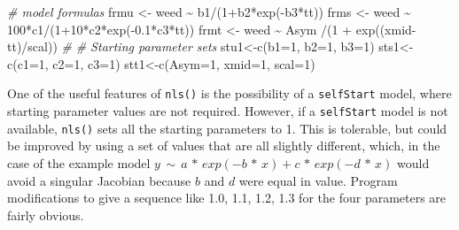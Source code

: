 \documentclass[
]{article}
\newenvironment{Shaded}{\begin{snugshade}}{\end{snugshade}}
\newcommand{\AttributeTok}[1]{\textcolor[rgb]{0.77,0.63,0.00}{#1}}
\newcommand{\CommentTok}[1]{\textcolor[rgb]{0.56,0.35,0.01}{\textit{#1}}}
\newcommand{\DecValTok}[1]{\textcolor[rgb]{0.00,0.00,0.81}{#1}}
\newcommand{\FloatTok}[1]{\textcolor[rgb]{0.00,0.00,0.81}{#1}}
\newcommand{\FunctionTok}[1]{\textcolor[rgb]{0.00,0.00,0.00}{#1}}
\newcommand{\NormalTok}[1]{#1}
\newcommand{\OtherTok}[1]{\textcolor[rgb]{0.56,0.35,0.01}{#1}}
\newcommand{\SpecialCharTok}[1]{\textcolor[rgb]{0.00,0.00,0.00}{#1}}
\begin{document}
\begin{Shaded}
\begin{Highlighting}[]
\CommentTok{\# model formulas}
\NormalTok{frmu }\OtherTok{\textless{}{-}}\NormalTok{ weed }\SpecialCharTok{\textasciitilde{}}\NormalTok{ b1}\SpecialCharTok{/}\NormalTok{(}\DecValTok{1}\SpecialCharTok{+}\NormalTok{b2}\SpecialCharTok{*}\FunctionTok{exp}\NormalTok{(}\SpecialCharTok{{-}}\NormalTok{b3}\SpecialCharTok{*}\NormalTok{tt))}
\NormalTok{frms }\OtherTok{\textless{}{-}}\NormalTok{ weed }\SpecialCharTok{\textasciitilde{}} \DecValTok{100}\SpecialCharTok{*}\NormalTok{c1}\SpecialCharTok{/}\NormalTok{(}\DecValTok{1}\SpecialCharTok{+}\DecValTok{10}\SpecialCharTok{*}\NormalTok{c2}\SpecialCharTok{*}\FunctionTok{exp}\NormalTok{(}\SpecialCharTok{{-}}\FloatTok{0.1}\SpecialCharTok{*}\NormalTok{c3}\SpecialCharTok{*}\NormalTok{tt))}
\NormalTok{frmt }\OtherTok{\textless{}{-}}\NormalTok{ weed }\SpecialCharTok{\textasciitilde{}}\NormalTok{ Asym }\SpecialCharTok{/}\NormalTok{(}\DecValTok{1} \SpecialCharTok{+} \FunctionTok{exp}\NormalTok{((xmid}\SpecialCharTok{{-}}\NormalTok{tt)}\SpecialCharTok{/}\NormalTok{scal))}
\CommentTok{\#}
\CommentTok{\# Starting parameter sets}
\NormalTok{stu1}\OtherTok{\textless{}{-}}\FunctionTok{c}\NormalTok{(}\AttributeTok{b1=}\DecValTok{1}\NormalTok{, }\AttributeTok{b2=}\DecValTok{1}\NormalTok{, }\AttributeTok{b3=}\DecValTok{1}\NormalTok{)}
\NormalTok{sts1}\OtherTok{\textless{}{-}}\FunctionTok{c}\NormalTok{(}\AttributeTok{c1=}\DecValTok{1}\NormalTok{, }\AttributeTok{c2=}\DecValTok{1}\NormalTok{, }\AttributeTok{c3=}\DecValTok{1}\NormalTok{)}
\NormalTok{stt1}\OtherTok{\textless{}{-}}\FunctionTok{c}\NormalTok{(}\AttributeTok{Asym=}\DecValTok{1}\NormalTok{, }\AttributeTok{xmid=}\DecValTok{1}\NormalTok{, }\AttributeTok{scal=}\DecValTok{1}\NormalTok{)}
\end{Highlighting}
\end{Shaded}

One of the useful features of \texttt{nls()} is the possibility of a
\texttt{selfStart} model, where starting parameter values are not
required. However, if a \texttt{selfStart} model is not available,
\texttt{nls()} sets all the starting parameters to 1. This is tolerable,
but could be improved by using a set of values that are all slightly
different, which, in the case of the example model
\(y \,\sim\, a \,*\, exp(-b \,*\, x) + c\,*\,exp(-d \,*\, x)\) would
avoid a singular Jacobian because \(b\) and \(d\) were equal in value.
Program modifications to give a sequence like 1.0, 1.1, 1.2, 1.3 for the
four parameters are fairly obvious.
\end{document}

